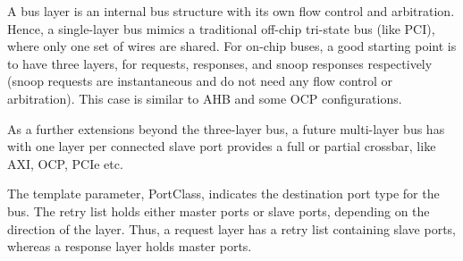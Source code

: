 A bus layer is an internal bus structure with its own flow control and arbitration. Hence, a single-\/layer bus mimics a traditional off-\/chip tri-\/state bus (like PCI), where only one set of wires are shared. For on-\/chip buses, a good starting point is to have three layers, for requests, responses, and snoop responses respectively (snoop requests are instantaneous and do not need any flow control or arbitration). This case is similar to AHB and some OCP configurations.

As a further extensions beyond the three-\/layer bus, a future multi-\/layer bus has with one layer per connected slave port provides a full or partial crossbar, like AXI, OCP, PCIe etc.

The template parameter, PortClass, indicates the destination port type for the bus. The retry list holds either master ports or slave ports, depending on the direction of the layer. Thus, a request layer has a retry list containing slave ports, whereas a response layer holds master ports. 

